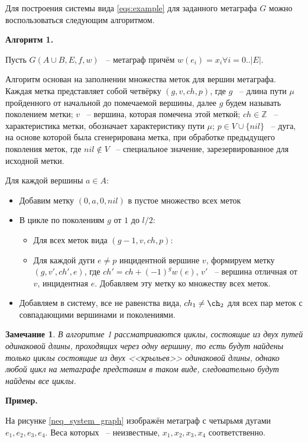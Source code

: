 \documentclass[14pt]{mmcs-article}
\newtheorem{notice}{Замечание}
\begin{document}
Для построения системы вида \ref{eqs:example} для заданного метаграфа $G$ можно воспользоваться следующим алгоритмом.

\textbf{Алгоритм 1.}

Пусть $G(A \cup B, E, f, w)$ ~-- метаграф причём $w(e_i) = x_i \forall i = 0..|E|$.

Алгоритм основан на заполнении множества меток для вершин метаграфа. Каждая метка представляет собой четвёрку $(g, v, ch, p)$, где $g$ ~-- длина пути $\mu$ пройденного от начальной до помечаемой вершины, далее $g$ будем называть поколением метки; $v$ ~-- вершина, которая помечена этой меткой; $ch \in \mathbb{Z}$ ~-- характеристика метки, обозначает характеристику пути $\mu$; $p \in V \cup \{ nil \}$ ~-- дуга, на основе которой была сгенерирована метка, при обработке предыдущего поколения меток, где $nil \not\in V $ ~-- специальное значение, зарезервированное для исходной метки.

Для каждой вершины $a \in A$:

\begin{itemize}
    \item Добавим метку $(0, a, 0, nil)$ в пустое множество всех меток
    \item В цикле по поколениям $g$ от $1$ до $l / 2$:
    \begin{itemize}
        \item Для всех меток вида $(g - 1, v, ch, p)$:
        \item
            Для каждой дуги $e \not= p$ инцидентной вершине $v$,
            формируем метку $(g, v', ch', e)$, где $ch' = ch + (-1)^{g} w(e)$, $v'$ ~-- вершина отличная от $v$, инцидентная $e$.
            Добавляем эту метку ко множеству всех меток.
    \end{itemize}
    \item Добавляем в систему, все не равенства вида, $ch_1 \neq \ch_2$ для всех пар меток с совпадающими вершинами и поколениями.
\end{itemize}

\begin{notice}
    В алгоритме 1  рассматриваются циклы, состоящие из двух путей одинаковой длины, проходящих через одну вершину, то есть будут найдены только циклы состоящие из двух <<крыльев>> одинаковой длины, однако любой цикл на метаграфе представим в таком виде, следовательно будут найдены все циклы.
\end{notice}

\textbf{Пример.}

На рисунке \ref{neq_system_graph} изображён метаграф с четырьмя дугами $e_1, e_2, e_3, e_4$. Веса которых ~-- неизвестные, $x_1, x_2, x_3, x_4$ соответственно.
\end{document}
